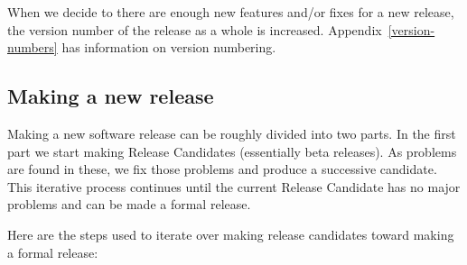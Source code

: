 \documentclass{dods-paper}
\begin{document}
When we decide to there are enough new features and/or fixes for a new
release, the version number of the release as a whole is increased.
Appendix~\ref{version-numbers} has information on version numbering.

\subsection{Making a new release}

Making a new software release can be roughly divided into two parts. In the
first part we start making Release Candidates (essentially beta releases). As
problems are found in these, we fix those problems and produce a successive
candidate. This iterative process continues until the current Release
Candidate has no major problems and can be made a formal release.

Here are the steps used to iterate over making release candidates toward
making a formal release:
\end{document}
